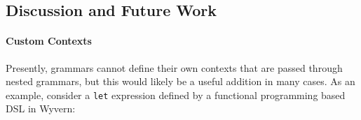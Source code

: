 






\subsection{Discussion and Future Work}
\paragraph{Custom Contexts}

Presently, grammars cannot define their own contexts that are passed through nested grammars, but this would likely be a useful addition in many cases. As an example, consider a \lstinline{let} expression defined by a functional programming based DSL in 
Wyvern:

